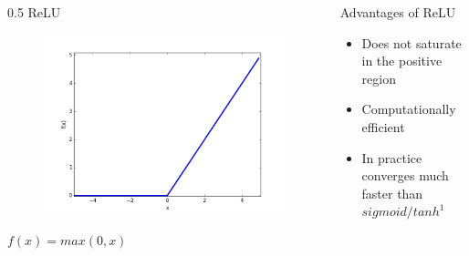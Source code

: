 \begin{frame}
	\begin{columns}
		\begin{column} {0.5\textwidth}
			ReLU
			
			\begin{center}
				\begin{figure}
					\includegraphics[scale=0.2]{images/relu_1.png}
				\end{figure}
			\end{center}
			\begin{center}
				\begin{math}
					f(x) = max(0,x)
				\end{math}
				
			\end{center}
			
		\end{column}
		\begin{column}{0.5\textwidth}
			Advantages of ReLU
			\begin{itemize}
				\justifying
				\item<1-> Does not saturate in the positive region
				\item<2-> Computationally efficient
				\item<3-> In practice converges much faster than $sigmoid/tanh^1$ 
			\end{itemize}
			
		\end{column}
		
	\end{columns}
	    
\end{frame}

